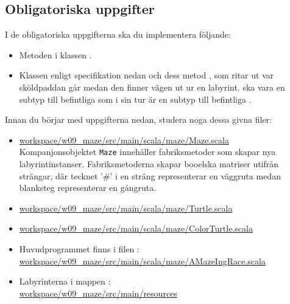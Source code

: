 \subsection{Obligatoriska uppgifter}

I de obligatoriska uppgifterna ska du implementera följande:
\begin{itemize}
\item Metoden  i klassen .

\item Klassen  enligt specifikation nedan och dess metod , som ritar ut var sköldpaddan går medan den finner vägen ut ur en labyrint.  ska vara en subtyp till befintliga  som i sin tur är en subtyp till befintliga .

\end{itemize}


\noindent Innan du börjar med uppgifterna nedan, studera noga dessa givna filer:
\begin{itemize}
\item
\href{https://github.com/lunduniversity/introprog/tree/master/workspace/w09_maze/src/main/scala/maze/Maze.scala}{workspace/w09\_maze/src/main/scala/maze/Maze.scala} \\
Kompanjonsobjektet \texttt{Maze} innehåller fabriksmetoder som skapar nya labyrintinstanser. Fabriksmetoderna  skapar booelska matriser utifrån strängar, där tecknet '\#' i en sträng representerar en väggruta medan blanksteg representerar en gångruta.

\item 
\href{https://github.com/lunduniversity/introprog/tree/master/workspace/w09_maze/src/main/scala/maze/Turtle.scala}{workspace/w09\_maze/src/main/scala/maze/Turtle.scala}

\item 
\href{https://github.com/lunduniversity/introprog/tree/master/workspace/w09_maze/src/main/scala/maze/ColorTurtle.scala}{workspace/w09\_maze/src/main/scala/maze/ColorTurtle.scala}

\item Huvudprogrammet  finns i filen :\\
\href{https://github.com/lunduniversity/introprog/tree/master/workspace/w09_maze/src/main/scala/maze/AMazeIngRace.scala}{workspace/w09\_maze/src/main/scala/maze/AMazeIngRace.scala}

\item Labyrinterna i mappen :\\
\href{https://github.com/lunduniversity/introprog/tree/master/workspace/w09_maze/src/main/resources}{workspace/w09\_maze/src/main/resources}

\end{itemize}

